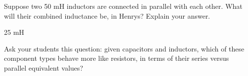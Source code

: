 

Suppose two 50 mH inductors are connected in parallel with each other.  What will their combined inductance be, in Henrys?  Explain your answer.







25 mH







Ask your students this question: given capacitors and inductors, which of these component types behave more like resistors, in terms of their series versus parallel equivalent values?




